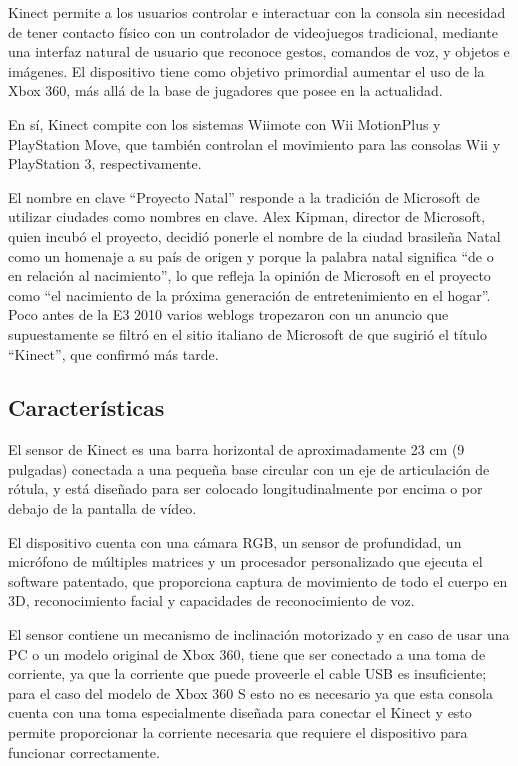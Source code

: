 Kinect permite a los usuarios controlar e interactuar con la consola sin necesidad de tener contacto físico con un controlador de videojuegos tradicional, mediante una interfaz natural de usuario que reconoce gestos, comandos de voz, y objetos e imágenes. El dispositivo tiene como objetivo primordial aumentar el uso de la Xbox 360, más allá de la base de jugadores que posee en la actualidad.

En sí, Kinect compite con los sistemas Wiimote con Wii MotionPlus y PlayStation Move, que también controlan el movimiento para las consolas Wii y PlayStation 3, respectivamente.

El nombre en clave ``Proyecto Natal'' responde a la tradición de Microsoft de utilizar ciudades como nombres en clave. Alex Kipman, director de Microsoft, quien incubó el proyecto, decidió ponerle el nombre de la ciudad brasileña Natal como un homenaje a su país de origen y porque la palabra natal significa ``de o en relación al nacimiento'', lo que refleja la opinión de Microsoft en el proyecto como ``el nacimiento de la próxima generación de entretenimiento en el hogar''. Poco antes de la E3 2010 varios weblogs tropezaron con un anuncio que supuestamente se filtró en el sitio italiano de Microsoft de que sugirió el título ``Kinect'', que confirmó más tarde.

\subsection{Características}
El sensor de Kinect es una barra horizontal de aproximadamente 23 cm (9 pulgadas) conectada a una pequeña base circular con un eje de articulación de rótula, y está diseñado para ser colocado longitudinalmente por encima o por debajo de la pantalla de vídeo.

El dispositivo cuenta con una cámara RGB, un sensor de profundidad, un micrófono de múltiples matrices y un procesador personalizado que ejecuta el software patentado, que proporciona captura de movimiento de todo el cuerpo en 3D, reconocimiento facial y capacidades de reconocimiento de voz.

El sensor contiene un mecanismo de inclinación motorizado y en caso de usar una PC o un modelo original de Xbox 360, tiene que ser conectado a una toma de corriente, ya que la corriente que puede proveerle el cable USB es insuficiente; para el caso del modelo de Xbox 360 S esto no es necesario ya que esta consola cuenta con una toma especialmente diseñada para conectar el Kinect y esto permite proporcionar la corriente necesaria que requiere el dispositivo para funcionar correctamente.


